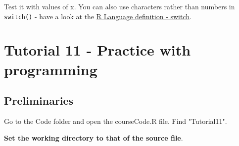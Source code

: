 \documentclass[titlepage]{book}\usepackage{knitr}
\begin{document}
\begin{knitrout}
\color{fgcolor}\begin{kframe}
\begin{alltt}
  \hlkwb{<-} 
  \hlopt{<}  \hlstd{)\{}
   \hlopt{+}\hlstd{,} \hlstd{(}\hlopt{:}\hlstd{),} \hlstd{(}\hlstd{))}
\hlstd{\}}  \hlstd{\{}
  \hlstd{(}\hlstd{)}
\hlstd{\}}
\end{alltt}
\end{kframe}
\end{knitrout}
Test it with values of x.
You can also use characters rather than numbers in \texttt{switch()} - have a look at the  \href{http://cran.r-project.org/doc/manuals/r-release/R-lang.html\#if}{R Language definition - switch}.










\chapter{Tutorial 11 - Practice with programming}

\author{Brian Williams $<$\href{mailto:bjw649@gmail.com}%
{bjw649@gmail.com}$>$}


\section{Preliminaries}

Go to the Code folder and open the courseCode.R file.  Find "Tutorial11".

\textbf{Set the working directory to that of the source file}.








\end{document}
